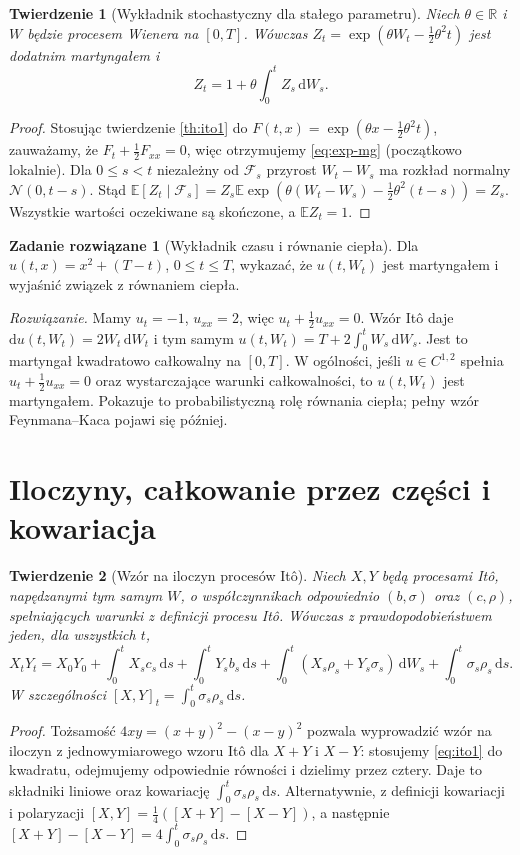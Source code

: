 \documentclass[11pt,a4paper,oneside]{report}
\numberwithin{equation}{chapter}
\theoremstyle{plain}
\newtheorem{twierdzenie}{Twierdzenie}[chapter]
\theoremstyle{definition}
\newtheorem{zadanie}{Zadanie rozwiązane}[chapter]
\theoremstyle{remark}
\newcommand{\R}{\mathbb{R}}
\newcommand{\E}{\mathbb{E}}
\newcommand{\calF}{\mathcal{F}}
\newcommand{\dd}{\mathrm{d}}
\newcommand{\Normal}{\mathcal{N}}
\begin{document}
\begin{twierdzenie}[Wykładnik stochastyczny dla stałego parametru]\label{thm:volIII:03:02}
Niech $\theta\in\R$ i $W$ będzie procesem Wienera na
$[0,T]$. Wówczas $Z_t=\exp(\theta W_t-\tfrac12\theta^2t)$
jest dodatnim martyngałem i
\[
Z_t=1+\theta\int_0^t Z_s\,\dd W_s.
\tag{3.4}\label{eq:exp-mg}
\]
\end{twierdzenie}
\begin{proof}
Stosując twierdzenie \ref{th:ito1} do
$F(t,x)=\exp(\theta x-\frac12\theta^2t)$, zauważamy,
że $F_t+\frac12F_{xx}=0$, więc otrzymujemy
\eqref{eq:exp-mg} (początkowo lokalnie).
Dla $0\le s<t$ niezależny od $\calF_s$ przyrost
$W_t-W_s$ ma rozkład normalny $\Normal(0,t-s)$.
Stąd
$\E[Z_t\mid\calF_s]=Z_s\E\exp(\theta(W_t-W_s)
-\frac12\theta^2(t-s))=Z_s$.
Wszystkie wartości oczekiwane są skończone, a
$\E Z_t=1$.
\end{proof}

\begin{zadanie}[Wykładnik czasu i równanie ciepła]
Dla $u(t,x)=x^2+(T-t)$, $0\le t\le T$,
wykazać, że $u(t,W_t)$ jest martyngałem i
wyjaśnić związek z równaniem ciepła.

\emph{Rozwiązanie.} Mamy $u_t=-1$, $u_{xx}=2$,
więc $u_t+\frac12u_{xx}=0$. Wzór Itô daje
$\dd u(t,W_t)=2W_t\,\dd W_t$ i tym samym
$u(t,W_t)=T+2\int_0^tW_s\,\dd W_s$.
Jest to martyngał kwadratowo całkowalny na $[0,T]$.
W ogólności, jeśli $u\in C^{1,2}$ spełnia
$u_t+\frac12u_{xx}=0$ oraz wystarczające warunki
całkowalności, to $u(t,W_t)$ jest martyngałem.
Pokazuje to probabilistyczną rolę równania ciepła;
pełny wzór Feynmana--Kaca pojawi się później.
\end{zadanie}

\section{Iloczyny, całkowanie przez części i kowariacja}\label{sec:volIII:03:05}
\begin{twierdzenie}[Wzór na iloczyn procesów Itô]\label{thm:volIII:03:03}
\label{th:ito-product}
Niech $X,Y$ będą procesami Itô, napędzanymi tym samym
$W$, o współczynnikach odpowiednio $(b,\sigma)$ oraz
$(c,\rho)$, spełniających warunki z definicji procesu Itô.
Wówczas z prawdopodobieństwem jeden, dla wszystkich $t$,
\[
X_tY_t=X_0Y_0+\int_0^tX_sc_s\,\dd s
+\int_0^tY_sb_s\,\dd s
+\int_0^t(X_s\rho_s+Y_s\sigma_s)\,\dd W_s
+\int_0^t\sigma_s\rho_s\,\dd s.
\tag{3.5}\label{eq:ito-product}
\]
W szczególności $[X,Y]_t=\int_0^t\sigma_s\rho_s\,\dd s$.
\end{twierdzenie}
\begin{proof}
Tożsamość $4xy=(x+y)^2-(x-y)^2$ pozwala wyprowadzić
wzór na iloczyn z jednowymiarowego wzoru Itô dla
$X+Y$ i $X-Y$: stosujemy \eqref{eq:ito1} do kwadratu,
odejmujemy odpowiednie równości i dzielimy przez cztery.
Daje to składniki liniowe oraz kowariację
$\int_0^t\sigma_s\rho_s\,\dd s$. Alternatywnie, z definicji
kowariacji i polaryzacji $[X,Y]=\frac14([X+Y]-[X-Y])$,
a następnie $[X+Y]-[X-Y]=4\int_0^t\sigma_s\rho_s\,\dd s$.
\end{proof}
\end{document}
